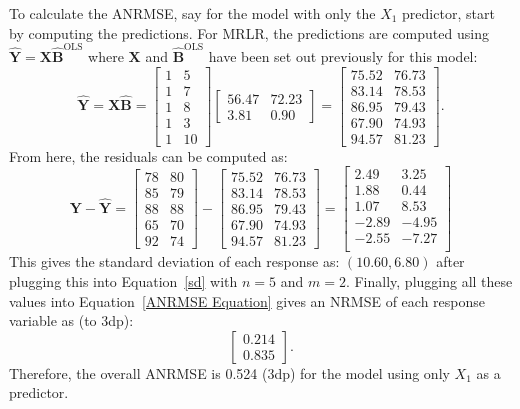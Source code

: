 \documentclass[11pt]{report} %
\begin{document}
To calculate the ANRMSE, say for the model with only the $X_1$ predictor, start by computing the predictions. For MRLR, the predictions are computed using $\mathbf{\hat{Y}} = \mathbf{X}\hat{\mathbf{B}}^\text{OLS}$ where $\mathbf{X}$ and $\hat{\mathbf{B}}^\text{OLS}$ have been set out previously for this model: 
\[
\mathbf{\hat{Y}} = \mathbf{X}\hat{\mathbf{B}} = \begin{bmatrix}
1 & 5 \\
1 & 7 \\
1 & 8 \\
1 & 3 \\
1 & 10
\end{bmatrix}
\begin{bmatrix}
56.47 & 72.23 \\
3.81 & 0.90
\end{bmatrix}=
\begin{bmatrix}
75.52 & 76.73 \\
83.14 & 78.53 \\
86.95 & 79.43 \\
67.90 & 74.93 \\
94.57 & 81.23
\end{bmatrix}.
\]
From here, the residuals can be computed as:
\[
\mathbf{Y} - \hat{\mathbf{Y}} = \begin{bmatrix}
78 & 80 \\
85 & 79 \\
88 & 88 \\
65 & 70 \\
92 & 74
\end{bmatrix} - \begin{bmatrix}
75.52 & 76.73 \\
83.14 & 78.53 \\
86.95 & 79.43 \\
67.90 & 74.93 \\
94.57 & 81.23
\end{bmatrix} = \begin{bmatrix}
2.49 & 3.25 \\
1.88 & 0.44 \\
1.07 & 8.53 \\
-2.89 & -4.95 \\
-2.55 & -7.27 \\
\end{bmatrix}
\]
This gives the standard deviation of each response as: $(10.60, 6.80)$ after plugging this into Equation~\ref{sd} with $n=5$ and $m=2$. Finally, plugging all these values into Equation~\ref{ANRMSE Equation} gives an NRMSE of each response variable as (to 3dp):
\[
\begin{bmatrix}
    0.214 \\
    0.835
\end{bmatrix}.
\]
Therefore, the overall ANRMSE is 0.524 (3dp) for the model using only $X_1$ as a predictor.
\end{document}
